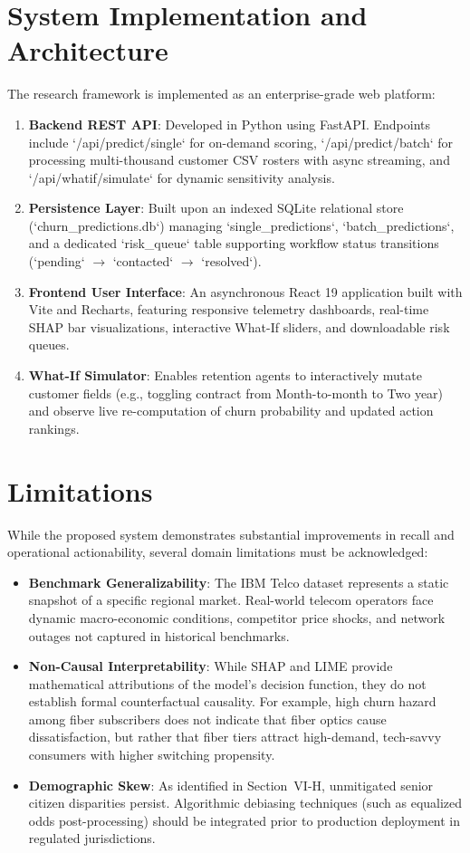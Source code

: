 \documentclass[conference]{IEEEtran}
\begin{document}
\section{System Implementation and Architecture}
The research framework is implemented as an enterprise-grade web platform:
\begin{enumerate}
    \item \textbf{Backend REST API}: Developed in Python using FastAPI. Endpoints include `/api/predict/single` for on-demand scoring, `/api/predict/batch` for processing multi-thousand customer CSV rosters with async streaming, and `/api/whatif/simulate` for dynamic sensitivity analysis.
    \item \textbf{Persistence Layer}: Built upon an indexed SQLite relational store (`churn_predictions.db`) managing `single_predictions`, `batch_predictions`, and a dedicated `risk_queue` table supporting workflow status transitions (`pending` $\rightarrow$ `contacted` $\rightarrow$ `resolved`).
    \item \textbf{Frontend User Interface}: An asynchronous React 19 application built with Vite and Recharts, featuring responsive telemetry dashboards, real-time SHAP bar visualizations, interactive What-If sliders, and downloadable risk queues.
    \item \textbf{What-If Simulator}: Enables retention agents to interactively mutate customer fields (e.g., toggling contract from Month-to-month to Two year) and observe live re-computation of churn probability and updated action rankings.
\end{enumerate}

\section{Limitations}
While the proposed system demonstrates substantial improvements in recall and operational actionability, several domain limitations must be acknowledged:
\begin{itemize}
    \item \textbf{Benchmark Generalizability}: The IBM Telco dataset represents a static snapshot of a specific regional market. Real-world telecom operators face dynamic macro-economic conditions, competitor price shocks, and network outages not captured in historical benchmarks.
    \item \textbf{Non-Causal Interpretability}: While SHAP and LIME provide mathematical attributions of the model's decision function, they do not establish formal counterfactual causality. For example, high churn hazard among fiber subscribers does not indicate that fiber optics cause dissatisfaction, but rather that fiber tiers attract high-demand, tech-savvy consumers with higher switching propensity.
    \item \textbf{Demographic Skew}: As identified in Section~VI-H, unmitigated senior citizen disparities persist. Algorithmic debiasing techniques (such as equalized odds post-processing) should be integrated prior to production deployment in regulated jurisdictions.
\end{itemize}
\end{document}

